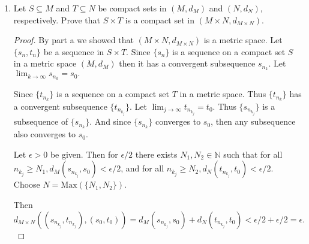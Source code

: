 \documentclass[reqno]{article}
\theoremstyle{remark}
\numberwithin{equation}{section}
\newcommand{\N}{\mathbb{N}}
\begin{document}
\begin{enumerate}
\begin{enumerate}
\begin{proof}
\begin{itemize}
    Since $d_M, d_N$ are metrics then for all $x_1,x_2,x_3 \in M, y_1,y_2,y_3 \in N$ we have that $d_M(x_1,x_2)\leq d_M(x_1,x_3)+d_M(x_3,x_2)$ and that $d_N(y_1,y_2)\leq d_N(y_1,y_3)+d_N(y_3,y_2).$ Therefore,
    \begin{align*}
        d_{M \times N}((x_1,y_1),(x_2,y_2))&=d_M(x_1,x_2)+d_N(y_1,y_2)\\
      d_M(x_1,x_2)+d_N(y_1,y_2) &\leq d_M(x_1,x_3)+d_M(x_3,x_2)+d_N(y_1,y_3)+d_N(y_3,y_2)\\
       d_M(x_1,x_3)+d_M(x_3,x_2)+d_N(y_1,y_3)+d_N(y_3,y_2) &=d_M(x_1,x_3)+d_N(y_1,y_3)+d_M(x_3,x_2)+d_N(y_3,y_2)\\
      d_M(x_1,x_3)+d_N(y_1,y_3)+d_M(x_3,x_2)+d_N(y_3,y_2)&=d_M((x_1,y_1),(x_3,y_3))+d_M((x_3,y_3),(x_2,y_2)). 
    \end{align*}
    
    Hence $ d_{M \times N}((x_1,y_1),(x_2,y_2))\leq d_M((x_1,y_1),(x_3,y_3))+d_M((x_3,y_3),(x_2,y_2)).$
\end{itemize}
Therefore $d_{M \times N}$ is a metric on $M \times N$ and $(M \times N, d_{M\times N})$ is a metric space.
\end{proof} 
	
\item Let $S \subseteq M$ and $T \subseteq N$ be compact sets in $(M, d_M)$ and $(N, d_N)$, respectively. Prove that $S \times T$ is a compact set in $(M \times N, d_{M \times N})$.

\begin{proof} 
By part a we showed that $(M \times N, d_{M \times N})$ is a metric space. Let $\{s_n,t_n\}$ be a sequence in $S \times T.$ Since $\{s_n\}$ is a sequence on a compact set $S$ in a metric space $(M,d_M)$ then it has a convergent subsequence ${s_{n_k}}.$ Let $\lim_{k \to \infty}{s_{n_k}}=s_0.$

Since $\{t_{n_k}\}$ is a sequence on a compact set $T$ in a metric space. Thus $\{t_{n_k}\}$ has a convergent subsequence $\{t_{n_{k_j}}\}.$ Let $\lim_{j\to \infty} t_{n_{k_j}}=t_0.$ Thus $\{s_{n_{k_j}}\}$ is a subsequence of $\{s_{n_k}\}.$ And since $\{s_{n_k}\}$ converges to $s_0$, then any subsequence also converges to $s_0.$

Let $\epsilon >0$ be given. Then for $\epsilon/2$ there exists $N_1, N_2\in \N$ such that for all $n_{k_j}\geq N_1, d_M(s_{n_{k_j}},s_0)<\epsilon/2$, and for all $n_{k_j}\geq N_2, d_N(t_{n_{k_j}},t_0)<\epsilon/2$. Choose $N=\text{Max}(\{N_1,N_2\}).$

Then $d_{M \times N}((s_{n_{k_j}},t_{n_{k_j}}),(s_0,t_0))=d_M(s_{n_{k_j}},s_0)+d_N(t_{n_{k_j}},t_0)<\epsilon/2 + \epsilon/2 = \epsilon.$


\end{proof}
\end{enumerate}
\end{enumerate}
\end{document}
